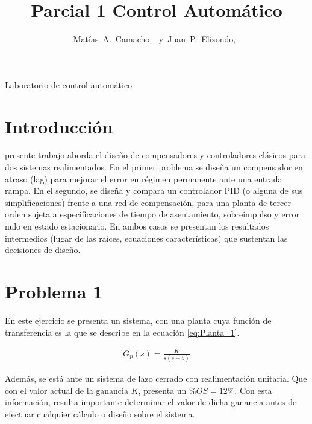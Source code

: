 \documentclass[journal]{IEEEtran}
\begin{document}
\setlength{\parindent}{4.2mm}
\title{Parcial 1 Control Automático}

\author{Matías~A.~Camacho,~
        y~Juan~P.~Elizondo,~
}

%
{Laboratorio de control automático}


\maketitle


\section{Introducción}

 presente trabajo aborda el diseño de compensadores y controladores clásicos para dos sistemas realimentados. En el primer problema se diseña un compensador en atraso (lag) para mejorar el error en régimen permanente ante una entrada rampa. En el segundo, se diseña y compara un controlador PID (o alguna de sus simplificaciones) frente a una red de compensación, para una planta de tercer orden sujeta a especificaciones de tiempo de asentamiento, sobreimpulso y error nulo en estado estacionario. En ambos casos se presentan los resultados intermedios (lugar de las raíces, ecuaciones características) que sustentan las decisiones de diseño.

\section{Problema 1}
En este ejercicio se presenta un sistema, con una planta cuya función de transferencia
es la que se describe en la ecuación \eqref{eq:Planta_1}.

\begin{equation}
        \begin{aligned}
                G_p(s)=\frac{K}{s(s+5)}
        \end{aligned}
\label{eq:Planta_1}
\end{equation}

Además, se está ante un sistema de lazo cerrado con realimentación unitaria. Que con el valor actual
de la ganancia $K$, presenta un $\%OS = 12\%$. Con esta información, resulta importante determinar el valor
de dicha ganancia antes de efectuar cualquier cálculo o diseño sobre el sistema.
\end{document}
